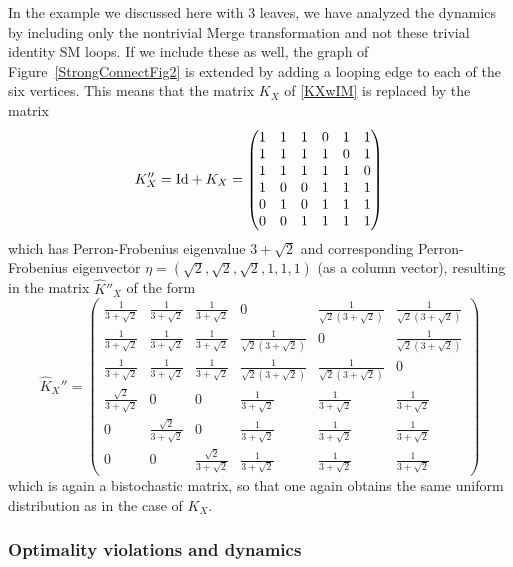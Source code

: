 \documentclass[12pt]{amsart}
\numberwithin{equation}{section}
\begin{document}
In the example we discussed here with $3$ leaves, we have analyzed the dynamics by
including only the nontrivial Merge transformation and not these trivial identity SM loops.
If we include these as well, the graph of Figure~\ref{StrongConnectFig2} is extended
by adding a looping edge to each of the six vertices. This means that the matrix $K_X$
of \eqref{KXwIM} is replaced by the matrix
$$ K_X'' ={\rm Id} + K_X = \begin{pmatrix} 1 & 1 & 1 & 0 & 1 & 1 \\
1 & 1 & 1 & 1 & 0 & 1 \\
1 & 1 & 1 & 1 & 1 & 0 \\
1 & 0 & 0 & 1 & 1 & 1 \\
0 & 1 & 0 & 1 & 1 & 1 \\
0 & 0 & 1 & 1 & 1 & 1 
\end{pmatrix} \,
$$
which has Perron-Frobenius eigenvalue $3+\sqrt{2}$ and corresponding
Perron-Frobenius eigenvector $\eta=(\sqrt{2},\sqrt{2}, \sqrt{2},1,1,1)$ (as
a column vector), resulting in the matrix $\hat K''_X$ of the form
$$ \hat K_X'' =\begin{pmatrix}
\frac{1}{3 + \sqrt{2}} & \frac{1}{3 + \sqrt{2}} & \frac{1}{3 + \sqrt{2}} & 0 & \frac{1}{\sqrt{2}(3 + \sqrt{2})} & \frac{1}{\sqrt{2}(3 + \sqrt{2})} \\
\frac{1}{3 + \sqrt{2}} & \frac{1}{3 + \sqrt{2}} & \frac{1}{3 + \sqrt{2}} & \frac{1}{\sqrt{2}(3 + \sqrt{2})} & 0 & \frac{1}{\sqrt{2}(3 + \sqrt{2})} \\
\frac{1}{3 + \sqrt{2}} & \frac{1}{3 + \sqrt{2}} & \frac{1}{3 + \sqrt{2}} & \frac{1}{\sqrt{2}(3 + \sqrt{2})} & \frac{1}{\sqrt{2}(3 + \sqrt{2})} & 0 \\
\frac{\sqrt{2}}{3 + \sqrt{2}} & 0 & 0 & \frac{1}{3 + \sqrt{2}} & \frac{1}{3 + \sqrt{2}} & \frac{1}{3 + \sqrt{2}} \\
0 & \frac{\sqrt{2}}{3 + \sqrt{2}} & 0 & \frac{1}{3 + \sqrt{2}} & \frac{1}{3 + \sqrt{2}} & \frac{1}{3 + \sqrt{2}} \\
0 & 0 & \frac{\sqrt{2}}{3 + \sqrt{2}} & \frac{1}{3 + \sqrt{2}} & \frac{1}{3 + \sqrt{2}} & \frac{1}{3 + \sqrt{2}} 
\end{pmatrix} $$
which is again a bistochastic matrix, so that one again obtains
the same uniform distribution as in the case of $K_X$. 

\smallskip
\subsubsection{Optimality violations and dynamics} 
\end{document}
